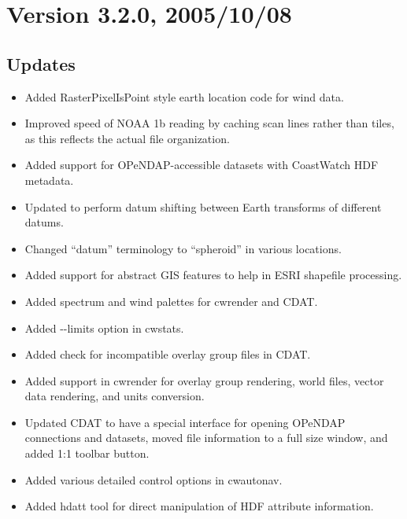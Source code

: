 

\section*{Version 3.2.0, 2005/10/08}
  
\subsection*{Updates}
\begin{itemize}

  \item Added RasterPixelIsPoint style earth location code for wind
  data.

  \item Improved speed of NOAA 1b reading by caching scan lines rather
  than tiles, as this reflects the actual file organization.

  \item Added support for OPeNDAP-accessible datasets with CoastWatch
  HDF metadata.

  \item Updated to perform datum shifting between Earth
  transforms of different datums.

  \item Changed ``datum'' terminology to ``spheroid'' in various
  locations.

  \item Added support for abstract GIS features to help in ESRI
  shapefile processing.

  \item Added spectrum and wind palettes for cwrender and CDAT.

  \item Added -{-}limits option in cwstats.

  \item Added check for incompatible overlay group files in CDAT.

  \item Added support in cwrender for overlay group rendering, world
  files, vector data rendering, and units conversion.

  \item Updated CDAT to have a special interface for opening OPeNDAP
  connections and datasets, moved file information to a full size
  window, and added 1:1 toolbar button.

  \item Added various detailed control options in cwautonav.

  \item Added hdatt tool for direct manipulation of HDF attribute
  information.

\end{itemize}

